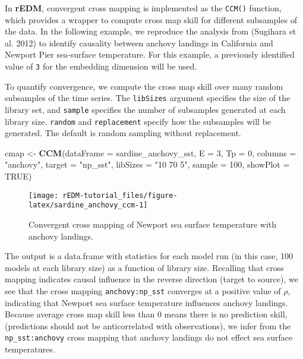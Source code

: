 \documentclass[]{article}
\newenvironment{Shaded}{\begin{snugshade}}{\end{snugshade}}
\newcommand{\DataTypeTok}[1]{\textcolor[rgb]{0.13,0.29,0.53}{#1}}
\newcommand{\DecValTok}[1]{\textcolor[rgb]{0.00,0.00,0.81}{#1}}
\newcommand{\KeywordTok}[1]{\textcolor[rgb]{0.13,0.29,0.53}{\textbf{#1}}}
\newcommand{\NormalTok}[1]{#1}
\newcommand{\OtherTok}[1]{\textcolor[rgb]{0.56,0.35,0.01}{#1}}
\newcommand{\StringTok}[1]{\textcolor[rgb]{0.31,0.60,0.02}{#1}}
\begin{document}
In \textbf{rEDM}, convergent cross mapping is implemented as the
\texttt{CCM()} function, which provides a wrapper to compute cross map
skill for different subsamples of the data. In the following example, we
reproduce the analysis from (Sugihara et al. 2012) to identify causality
between anchovy landings in California and Newport Pier sea-surface
temperature. For this example, a previously identified value of
\texttt{3} for the embedding dimension will be used.

To quantify convergence, we compute the cross map skill over many random
subsamples of the time series. The \texttt{libSizes} argument specifies
the size of the library set, and \texttt{sample} specifies the number of
subsamples generated at each library size. \texttt{random} and
\texttt{replacement} specify how the subsamples will be generated. The
default is random sampling without replacement.

\begin{Shaded}
\begin{Highlighting}[]
\NormalTok{cmap <-}\StringTok{ }\KeywordTok{CCM}\NormalTok{(}\DataTypeTok{dataFrame =}\NormalTok{ sardine_anchovy_sst, }\DataTypeTok{E =} \DecValTok{3}\NormalTok{, }\DataTypeTok{Tp =} \DecValTok{0}\NormalTok{, }\DataTypeTok{columns =} \StringTok{"anchovy"}\NormalTok{, }
    \DataTypeTok{target =} \StringTok{"np_sst"}\NormalTok{, }\DataTypeTok{libSizes =} \StringTok{"10 70 5"}\NormalTok{, }\DataTypeTok{sample =} \DecValTok{100}\NormalTok{, }\DataTypeTok{showPlot =} \OtherTok{TRUE}\NormalTok{)}
\end{Highlighting}
\end{Shaded}

\begin{figure}[h]

{\centering \texttt{[image: rEDM-tutorial\_files/figure-latex/sardine\_anchovy\_ccm-1]} 

}

\caption{Convergent cross mapping of Newport sea surface temperature with anchovy landings.}\label{fig:sardine_anchovy_ccm}
\end{figure}

The output is a data.frame with statistics for each model run (in this
case, 100 models at each library size) as a function of library size.
Recalling that cross mapping indicates causal influence in the reverse
direction (target to source), we see that the cross mapping
\texttt{anchovy:np\_sst} converges at a positive value of \(\rho\),
indicating that Newport sea surface temperature influences anchovy
landings. Because average cross map skill less than 0 means there is no
prediction skill, (predictions should not be anticorrelated with
observations), we infer from the \texttt{np\_sst:anchovy} cross mapping
that anchovy landings do not effect sea surface temperatures.
\end{document}
